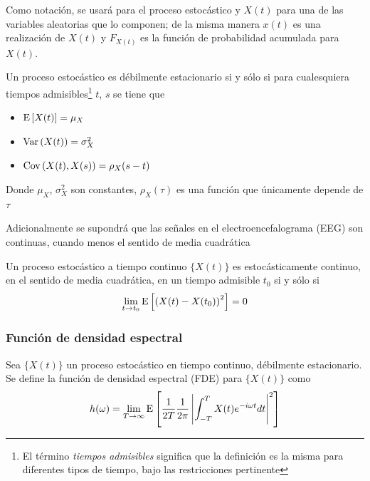 Como notaci\'on, se usar\'a \xt  para el proceso estoc\'astico y $X(t)$ para una de las variables
aleatorias que lo componen; de la misma manera $x(t)$ es una realizaci\'on de $X(t)$ y $F_{X(t)}$ 
es la funci\'on de probabilidad acumulada para $X(t)$.

\begin{definicion}
Un proceso estoc\'astico \xt es d\'ebilmente estacionario si y s\'olo si para cualesquiera tiempos 
admisibles\footnote{El t\'ermino \textit{tiempos admisibles} significa que la definición es la misma
para diferentes tipos de tiempo, bajo las restricciones pertinente} $t$, $s$ se tiene que
\begin{itemize}
\item $\mathrm{E}\left[ X(t) \right] = \mu_X$
\item $\mathrm{Var}\left( X(t) \right) = \sigma^{2}_X$
\item $\mathrm{Cov}\left( X(t),X(s) \right) = \rho_X (s-t)$
\end{itemize}
Donde $\mu_X$, $\sigma^{2}_X$ son constantes, $\rho_X(\tau)$ es una funci\'on que \'unicamente 
depende de $\tau$
\label{est_orden_primera}
\end{definicion}

Adicionalmente se supondrá que las señales en el electroencefalograma (EEG) son continuas, cuando menos
el sentido de media cuadrática

\begin{definicion}
Un proceso estoc\'astico a tiempo continuo $\{ X(t) \}$ es estoc\'asticamente continuo, en el 
sentido de media cuadr\'atica, en un tiempo admisible $t_0$ si y s\'olo si
\begin{equation*}
\lim_{t \rightarrow t_0} \mathrm{E}\left[ \left( X(t) - X(t_0) \right)^{2} \right] = 0
\end{equation*}
\label{cont_est}
\end{definicion}

\subsubsection{Función de densidad espectral}

\begin{definicion}
Sea $\{X(t)\}$ un proceso estoc\'astico en tiempo continuo, d\'ebilmente estacionario. Se define la 
funci\'on de densidad espectral (FDE) para $\{X(t)\}$ como
\begin{equation*}
h(\omega) = \lim_{T\rightarrow \infty} \mathrm{E}\left[  \frac{1}{2T} \frac{1}{2 \pi}
\left|  \int_{-T}^{T} X(t) e^{-i \omega t} dt \right|^{2}  \right]
\end{equation*}
\label{FDE}
\end{definicion}

